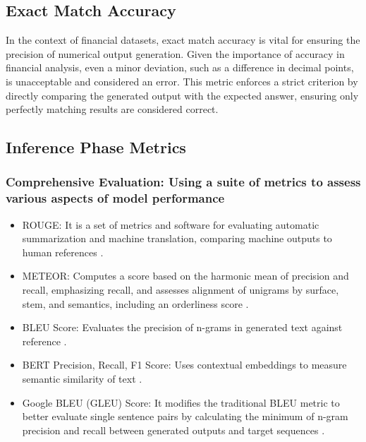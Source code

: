 \documentclass[logo,msc]{infthesis}           %
\begin{document}
\subsection{Exact Match Accuracy}
In the context of financial datasets, exact match accuracy is vital for ensuring the precision of numerical output generation. Given the importance of accuracy in financial analysis, even a minor deviation, such as a difference in decimal points, is unacceptable and considered an error. This metric enforces a strict criterion by directly comparing the generated output with the expected answer, ensuring only perfectly matching results are considered correct. 
\subsection{Inference Phase Metrics}
\subsubsection{Comprehensive Evaluation: Using a suite of metrics to assess various aspects of model performance}
\begin{itemize}
    \item ROUGE: It is a set of metrics and software for evaluating automatic summarization and machine translation, comparing machine outputs to human references \cite{lin-2004-rouge}.
    \item METEOR: Computes a score based on the harmonic mean of precision and recall, emphasizing recall, and assesses alignment of unigrams by surface, stem, and semantics, including an orderliness score \cite{banarjee2005}.
    \item BLEU Score: Evaluates the precision of n-grams in generated text against reference \cite{Papineni02bleu:a}.
    \item BERT Precision, Recall, F1 Score: Uses contextual embeddings to measure semantic similarity of text \cite{bert-score}.
    \item Google BLEU (GLEU) Score: It modifies the traditional BLEU metric to better evaluate single sentence pairs by calculating the minimum of n-gram precision and recall between generated outputs and target sequences \cite{wu2016googles}. 
\end{itemize}
\end{document}
